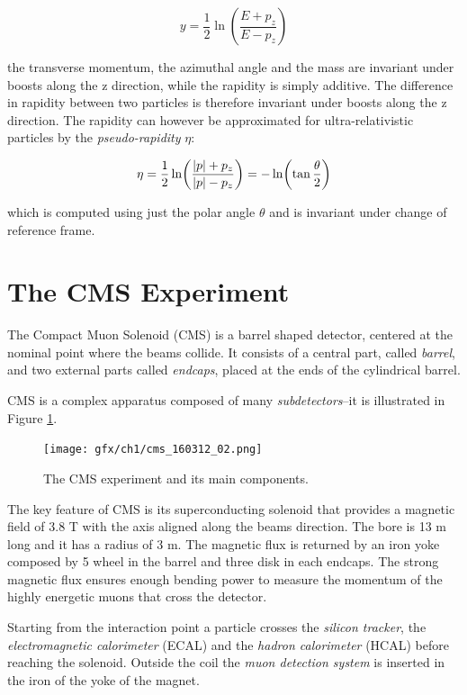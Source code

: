 \begin{equation*}
    y = \frac{1}{2}\ln(\frac{E + p_z}{E - p_z})
\end{equation*}

the transverse momentum, the azimuthal angle and the mass are invariant under boosts
along the z direction, while the rapidity is simply additive. The difference in rapidity between two particles is therefore invariant under boosts along the z direction.
The rapidity can however be approximated for ultra-relativistic particles by the \emph{pseudo-rapidity} $\eta$:

\begin{equation*}
    \eta = \frac{1}{2}\ln(\frac{\abs{p}+ p_z}{\abs{p} - p_z}) = -\ln(\tan\frac{\theta}{2}) 
\end{equation*}

which is computed using just the polar angle $\theta$ and is invariant under change of reference frame.

\section{The CMS Experiment}

The Compact Muon Solenoid (CMS) is a barrel shaped detector, centered at the
nominal point where the beams collide. It consists of a central part, called \emph{barrel},
and two external parts called \emph{endcaps}, placed at the ends of the cylindrical barrel.

CMS is a complex apparatus composed of many \emph{subdetectors}--it is illustrated in Figure \ref{fig:cms}.

\begin{figure}
    \centering
    \texttt{[image: gfx/ch1/cms\_160312\_02.png]}
    \caption[CMS]{The CMS experiment and its main components.}
    \label{fig:cms}
\end{figure}

The key feature of CMS is its superconducting solenoid that provides a magnetic field of
3.8 T with the axis aligned along the beams direction. The bore is 13 m long and
it has a radius of 3 m. The magnetic flux is returned by an iron yoke composed by
5 wheel in the barrel and three disk in each endcaps. The strong magnetic flux ensures enough bending power to measure the momentum of the highly energetic muons that
cross the detector.

Starting from the interaction point a particle crosses the\emph{ silicon tracker}, the \emph{electromagnetic calorimeter} (ECAL) and the \emph{hadron calorimeter} (HCAL) before reaching
the solenoid. Outside the coil the \emph{muon detection system} is inserted in the iron of the
yoke of the magnet.


